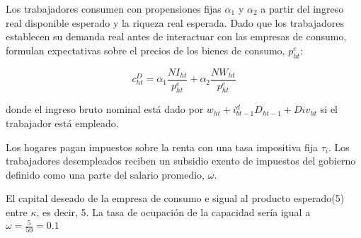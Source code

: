 \documentclass[12pt,a4paper]{article}
\begin{document}
 
Los trabajadores consumen con propensiones fijas $\alpha_1$ y $\alpha_2$ a partir del ingreso real disponible esperado y la riqueza real esperada. Dado que los trabajadores establecen su demanda real antes de interactuar con las empresas de consumo, formulan expectativas sobre el precios de los bienes de consumo, $p_{ht}^e$:

\begin{equation}
c_{ht}^D = \alpha_1 \dfrac{NI_{ht}}{p_{ht}^e} + \alpha_2 \dfrac{NW_{ht}}{p_{ht}^e}  
\end{equation}

donde el ingreso bruto nominal está dado por $w_{ht}+i_{bt-1}^dD_{ht-1}+Div_{ht}$ si el trabajador está empleado. 

Los hogares pagan impuestos sobre la renta con una tasa impositiva fija $\tau_i$. 
Los trabajadores desempleados reciben un subsidio exento de impuestos del gobierno definido como una parte del salario promedio, $\omega$.

El capital deseado de la empresa de consumo e sigual al producto esperado(5) entre $\kappa$, es decir, 5. La tasa de ocupación de la capacidad sería igual a $\omega = \frac{5}{50}=0.1$
\end{document}
